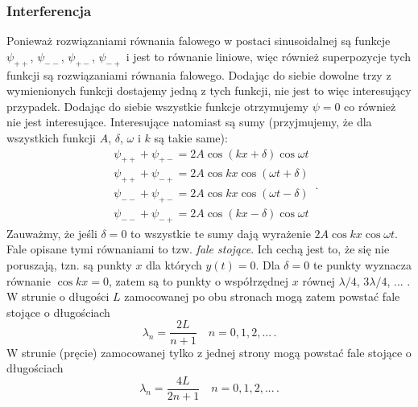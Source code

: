 \documentclass[../main.tex]{subfiles}
\begin{document}
        \subsubsection{Interferencja}
        Ponieważ rozwiązaniami równania falowego w postaci sinusoidalnej są funkcje \(\psi_{++}\),
        \(\psi_{--}\), \(\psi_{+-}\), \(\psi_{-+}\) i jest to równanie liniowe, więc również
        superpozycje tych funkcji są rozwiązaniami równania falowego. Dodając do siebie dowolne trzy
        z wymienionych funkcji dostajemy jedną z tych funkcji, nie jest to więc interesujący
        przypadek. Dodając do siebie wszystkie funkcje otrzymujemy \(\psi=0\) co również nie jest
        interesujące. Interesujące natomiast są sumy (przyjmujemy, że dla wszystkich funkcji \(A\),
        \(\delta\), \(\omega\) i \(k\) są takie same):
        \begin{equation*}
        \begin{split}
            &\psi_{++}+\psi_{+-}=2A\cos\left(kx+\delta\right)\cos\omega t\\
            &\psi_{++}+\psi_{-+}=2A\cos kx\cos\left(\omega t+\delta\right)\\
            &\psi_{--}+\psi_{+-}=2A\cos kx\cos(\omega t-\delta)\\
            &\psi_{--}+\psi_{-+}=2A\cos(kx-\delta)\cos\omega t
        \end{split}\,.
        \end{equation*}
        Zauważmy, że jeśli \(\delta=0\) to wszystkie te sumy dają wyrażenie \(2A\cos kx\cos\omega
        t\). Fale opisane tymi równaniami to tzw. \textit{fale stojące}. Ich cechą jest to, że się
        nie poruszają, tzn. są punkty \(x\) dla których \(y(t)=0\). Dla \(\delta=0\) te punkty
        wyznacza równanie \(\cos kx=0\), zatem są to punkty o współrzędnej \(x\) równej
        \(\lambda/4\), \(3\lambda/4\), ... . W strunie o długości \(L\) zamocowanej po obu stronach
        mogą zatem powstać fale stojące o długościach
        \begin{equation*}
            \lambda_n =\frac{2L}{n+1}\quad n=0,1,2,...\,.
        \end{equation*}
        W strunie (pręcie) zamocowanej tylko z jednej strony mogą powstać fale stojące o długościach
        \begin{equation*}
            \lambda_n=\frac{4L}{2n+1}\quad n=0,1,2,...\,.
        \end{equation*}
\end{document}
